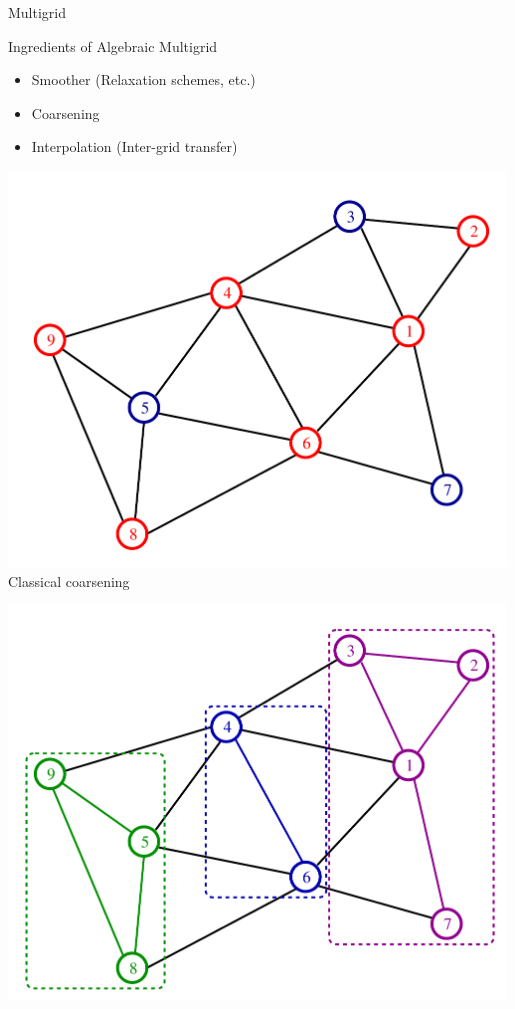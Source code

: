 \begin{frame}{Multigrid}

 \begin{minipage}{0.6\textwidth}
 \begin{block}{Ingredients of Algebraic Multigrid}
  \begin{itemize}
   \item Smoother (Relaxation schemes, etc.)
   \item Coarsening
   \item Interpolation (Inter-grid transfer)
  \end{itemize}
 \end{block}
 \end{minipage}

 \begin{minipage}{0.48\textwidth}
  \begin{center}
  \includegraphics[width=0.99\textwidth]{figures/graph-rs.pdf} \\
    Classical coarsening
  \end{center}
 \end{minipage}
 \begin{minipage}{0.48\textwidth}
  \begin{center}
    \includegraphics[width=0.99\textwidth]{figures/graph-ag.pdf} \\

\end{center}
\end{minipage}
\end{frame}
